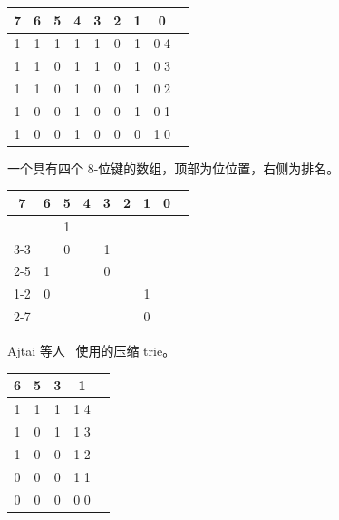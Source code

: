 \documentclass[11pt,a4paper]{ctexart}
\begin{document}
\begin{figure}[htbp]
\begin{center}
\begin{tabular}{*{9}{c}}
7 & 6 & 5 & 4 & 3 & 2 & 1 & 0 \\ \hline
1 & 1 & 1 & 1 & 1 & 0 & 1 & 0 \hspace{2em} 4\\
1 & 1 & 0 & 1 & 1 & 0 & 1 & 0 \hspace{2em} 3\\
1 & 1 & 0 & 1 & 0 & 0 & 1 & 0 \hspace{2em} 2\\
1 & 0 & 0 & 1 & 0 & 0 & 1 & 0 \hspace{2em} 1\\
1 & 0 & 0 & 1 & 0 & 0 & 0 & 1 \hspace{2em} 0
\end{tabular}

\medskip
一个具有四个 $8$-位键的数组，顶部为位位置，右侧为排名。

\bigskip

\begin{tabular}{*{9}{c}}
7 & 6 & 5 & 4 & 3 & 2 & 1 & 0 \\ \hline
  &   & 1 &   &   &   &   &    \\ \cline{3-3} \cline{5-5}
  &   & 0 &   & 1 &   &   &    \\ \cline{2-5}
  & 1 &   &   & 0 &   &   &    \\ \cline{1-2} \cline{5-5} \cline{7-7}
  & 0 &   &   &   &   & 1 &    \\ \cline{2-7}
  &   &   &   &   &   & 0 &
\end{tabular}

\medskip
Ajtai 等人~\cite{ajtai84hashing} 使用的压缩 trie。

\bigskip

\begin{tabular}{*{5}{c}}
6 & 5 & 3 & 1 \\ \hline
1 & 1 & 1 & 1 \hspace{2em} 4\\
1 & 0 & 1 & 1 \hspace{2em} 3\\
1 & 0 & 0 & 1 \hspace{2em} 2\\
0 & 0 & 0 & 1 \hspace{2em} 1\\
0 & 0 & 0 & 0 \hspace{2em} 0
\end{tabular}


\end{center}
\end{figure}
\end{document}
